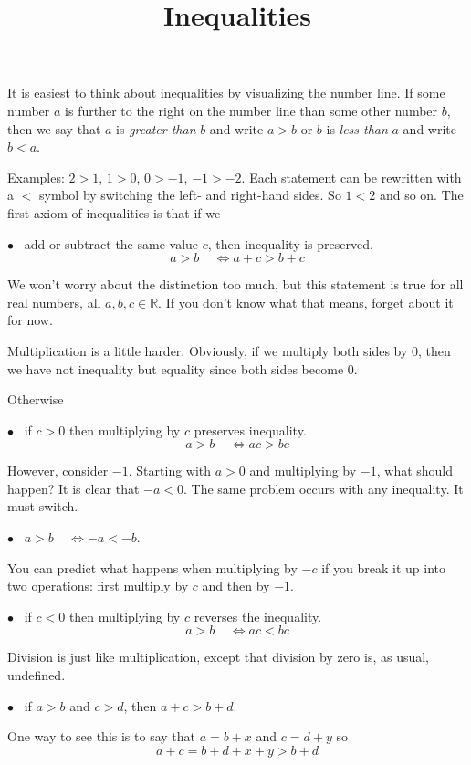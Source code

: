 \documentclass[11pt, oneside]{article}
\title{Inequalities}
\date{}
\begin{document}
\maketitle
\Large


It is easiest to think about inequalities by visualizing the number line.  If some number $a$ is further to the right on the number line than some other number $b$, then we say that $a$ is \emph{greater than} $b$ and write $a > b$ or $b$ is \emph{less than} $a$ and write $b < a$.

Examples:  $2 > 1$, $1 > 0$, $0 > -1$, $-1 > -2$.  Each statement can be rewritten with a $<$ symbol by switching the left- and right-hand sides.  So $1 < 2$ and so on.  The first axiom of inequalities is that if we

$\bullet$ \ add or subtract the same value $c$, then inequality is preserved.
\[ a > b \ \ \ \ \ \iff a + c > b + c \]

We won't worry about the distinction too much, but this statement is true for all real numbers, all $a,b,c \in \mathbb{R}$.  If you don't know what that means, forget about it for now. 

Multiplication is a little harder.  Obviously, if we multiply both sides by $0$, then we have not inequality but equality since both sides become $0$.  

Otherwise

$\bullet$ \  if $c > 0$ then multiplying by $c$ preserves inequality.
\[ a > b \ \ \ \ \ \iff ac > bc \]

However, consider $-1$.  Starting with $a > 0$ and multiplying by $-1$, what should happen?  It is clear that $-a < 0$.  The same problem occurs with any inequality.  It must switch.

$\bullet$ \  $a > b \ \ \ \ \ \iff -a < - b$.

You can predict what happens when multiplying by $-c$ if you break it up into two operations:  first multiply by $c$ and then by $-1$.

$\bullet$ \  if $c < 0$ then multiplying by $c$ reverses the inequality.
\[ a > b \ \ \ \ \ \iff ac < bc \]

Division is just like multiplication, except that division by zero is, as usual, undefined.

$\bullet$ \  if $a > b$ and $c > d$, then $a + c > b + d$.  

One way to see this is to say that $a = b + x$ and $c = d + y$ so 
\[ a + c = b + d + x + y > b + d \]
\end{document}
